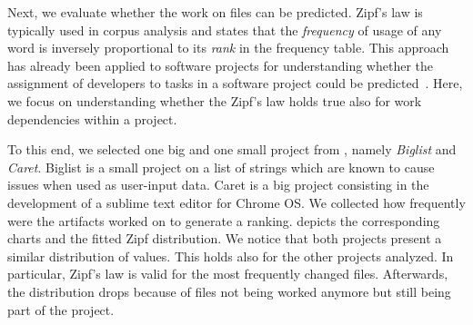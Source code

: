 Next, we evaluate whether the work on files can be predicted. Zipf's law is typically used in corpus analysis and states that the \emph{frequency} of usage of any word is inversely proportional to its \emph{rank} in the frequency table. This approach has already been applied to software projects for understanding whether the assignment of developers to tasks in a software project could be predicted~\cite{Canfora2006}. Here, we focus on understanding whether the Zipf's law holds true also for work dependencies within a project. 

To this end, we selected one big and one small project from , namely \emph{Biglist} and \emph{Caret}. Biglist is a small project on a list of strings which are known to cause issues when used as user-input data. Caret is a big project consisting in the development of a sublime text editor for Chrome OS.
We collected how frequently were the artifacts worked on to generate a ranking.  depicts the corresponding charts and the fitted Zipf distribution. We notice that both projects present a similar distribution of values. This holds also for the other projects analyzed. In particular, Zipf's law is valid for the most frequently changed files. Afterwards, the distribution drops because of files not being worked anymore but still being part of the project.

